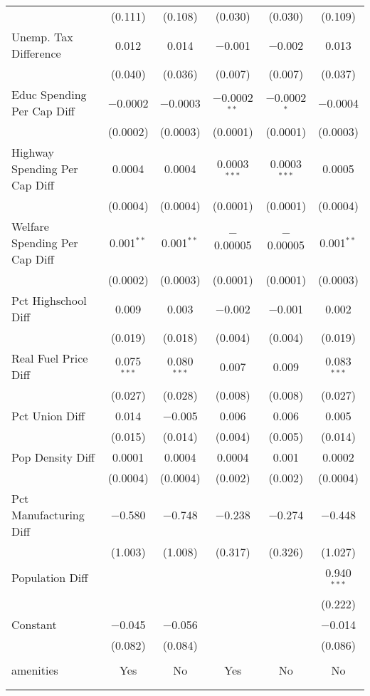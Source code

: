 \begin{table}[!htbp]
\begin{tabular}{@{\extracolsep{5pt}}lccccc}
  & (0.111) & (0.108) & (0.030) & (0.030) & (0.109) \\ 
  Unemp. Tax Difference & 0.012 & 0.014 & $-$0.001 & $-$0.002 & 0.013 \\ 
  & (0.040) & (0.036) & (0.007) & (0.007) & (0.037) \\ 
  Educ Spending Per Cap Diff & $-$0.0002 & $-$0.0003 & $-$0.0002$^{**}$ & $-$0.0002$^{*}$ & $-$0.0004 \\ 
  & (0.0002) & (0.0003) & (0.0001) & (0.0001) & (0.0003) \\ 
  Highway Spending Per Cap Diff & 0.0004 & 0.0004 & 0.0003$^{***}$ & 0.0003$^{***}$ & 0.0005 \\ 
  & (0.0004) & (0.0004) & (0.0001) & (0.0001) & (0.0004) \\ 
  Welfare Spending Per Cap Diff & 0.001$^{**}$ & 0.001$^{**}$ & $-$0.00005 & $-$0.00005 & 0.001$^{**}$ \\ 
  & (0.0002) & (0.0003) & (0.0001) & (0.0001) & (0.0003) \\ 
  Pct Highschool Diff & 0.009 & 0.003 & $-$0.002 & $-$0.001 & 0.002 \\ 
  & (0.019) & (0.018) & (0.004) & (0.004) & (0.019) \\ 
  Real Fuel Price Diff & 0.075$^{***}$ & 0.080$^{***}$ & 0.007 & 0.009 & 0.083$^{***}$ \\ 
  & (0.027) & (0.028) & (0.008) & (0.008) & (0.027) \\ 
  Pct Union Diff & 0.014 & $-$0.005 & 0.006 & 0.006 & 0.005 \\ 
  & (0.015) & (0.014) & (0.004) & (0.005) & (0.014) \\ 
  Pop Density Diff & 0.0001 & 0.0004 & 0.0004 & 0.001 & 0.0002 \\ 
  & (0.0004) & (0.0004) & (0.002) & (0.002) & (0.0004) \\ 
  Pct Manufacturing Diff & $-$0.580 & $-$0.748 & $-$0.238 & $-$0.274 & $-$0.448 \\ 
  & (1.003) & (1.008) & (0.317) & (0.326) & (1.027) \\ 
  Population Diff &  &  &  &  & 0.940$^{***}$ \\ 
  &  &  &  &  & (0.222) \\ 
  Constant & $-$0.045 & $-$0.056 &  &  & $-$0.014 \\ 
  & (0.082) & (0.084) &  &  & (0.086) \\ 
 \hline \\[-1.8ex] 
amenities & Yes & No & Yes & No & No \\ 
\hline \\[-1.8ex] 
\hline 
\hline \\[-1.8ex] 
\end{tabular} 
\end{table} 
